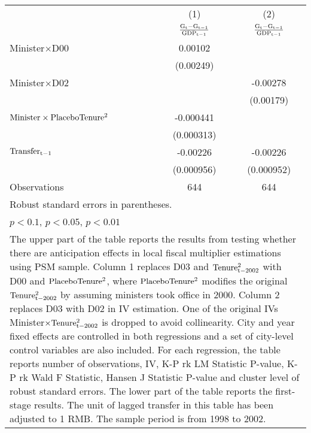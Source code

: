 \documentclass[11pt,a4paper]{article}
\begin{document}
\begin{center}
\begin{scriptsize}
{\begin{tabular}{l*{2}{c}}
\hline\hline
            &\multicolumn{1}{c}{(1)}&\multicolumn{1}{c}{(2)}\\
            &\multicolumn{1}{c}{$\rm \frac{ G_{t}-G_{t-1}}{GDP_{t-1}}$}&\multicolumn{1}{c}{$\rm \frac{ G_{t}-G_{t-1}}{GDP_{t-1}}$}\\
\hline
Minister\(\times\)D00   &     0.00102        &         \\
            &  (0.00249)      &        \\
[1em] 
Minister\(\times\)D02   &         &       -0.00278     \\
            &         &       (0.00179)       \\
[1em]
${\rm Minister \times PlaceboTenure^2}$   &  -0.000441       &       \\
            &     (0.000313)        &    \\
[1em]
$\rm Transfer_{t-1}$ &  -0.00226\sym{**} &    -0.00226\sym{**} \\
            &  (0.000956)     &   (0.000952)     \\
\hline
Observations       &         644         &         644         \\
\hline\hline
\multicolumn{3}{l}{\footnotesize Robust standard errors in parentheses.}\\
\multicolumn{3}{l}{\footnotesize \sym{*} \(p<0.1\), \sym{**} \(p<0.05\), \sym{***} \(p<0.01\)}\\
\multicolumn{3}{p{10cm}}{\footnotesize The upper part of the table reports the results from testing whether there are anticipation effects in local fiscal multiplier estimations using PSM sample. Column 1 replaces D03 and \(\rm Tenure_{t-2002}^2\) with D00 and \(\rm PlaceboTenure^2\), where \(\rm PlaceboTenure^2\) modifies the original \(\rm Tenure_{t-2002}^2\) by assuming ministers took office in 2000. Column 2 replaces D03 with D02 in IV estimation. One of the original IVs Minister\(\rm \times Tenure_{t-2002}^2 \) is dropped to avoid collinearity. City and year fixed effects are controlled in both regressions and a set of city-level control variables are also included. For each regression, the table reports number of observations, IV, K-P rk LM Statistic P-value, K-P rk Wald F Statistic, Hansen J Statistic P-value and cluster level of robust standard errors. The lower part of the table reports the first-stage results. The unit of lagged transfer in this table has been adjusted to 1 RMB. The sample period is from 1998 to 2002. }\\
\end{tabular}
}

\end{scriptsize}
\end{center}
\end{document}
